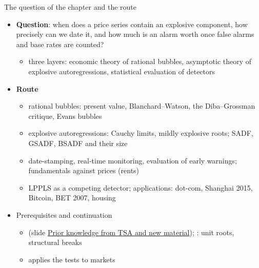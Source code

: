\begin{frame}{The question of the chapter and the route}
\itemsize{\small}
\begin{itemize}
    \item \textbf{Question}: when does a price series contain an explosive component, how precisely can we date it, and how much is an alarm worth once false alarms and base rates are counted?
    \begin{itemize}
        \item three layers: economic theory of rational bubbles, asymptotic theory of explosive autoregressions, statistical evaluation of detectors
    \end{itemize}
    \item \textbf{Route}
    \begin{itemize}
        \item rational bubbles: present value, Blanchard--Watson, the Diba--Grossman critique, Evans bubbles
        \item explosive autoregressions: Cauchy limits, mildly explosive roots; SADF, GSADF, BSADF and their size
        \item date-stamping, real-time monitoring, evaluation of early warnings; fundamentals against prices (rents)
        \item LPPLS as a competing detector; applications: dot-com, Shanghai 2015, Bitcoin, BET 2007, housing
    \end{itemize}
    \item Prerequisites and continuation
    \begin{itemize}
        \item {} (slide \hyperlink{c16known}{\textcolor{MainBlue}{Prior knowledge from TSA and new material}}); : unit roots, structural breaks
        \item {} applies the tests to markets
    \end{itemize}
\end{itemize}
\end{frame}

